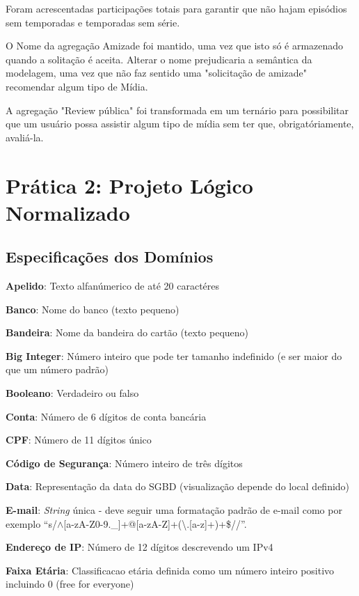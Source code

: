 \documentclass[12pt,a4paper]{article}
\begin{document}
    Foram acrescentadas participações totais para garantir que não hajam episódios sem temporadas e temporadas sem série.

    O Nome da agregação Amizade foi mantido, uma vez que isto só é armazenado quando a solitação é aceita. Alterar o nome prejudicaria a semântica da modelagem, uma vez que não faz sentido uma "solicitação de amizade" recomendar algum tipo de Mídia.

    A agregação "Review pública" foi transformada em um ternário para possibilitar que um usuário possa assistir algum tipo de mídia sem ter que, obrigatóriamente, avaliá-la.

\section{Prática 2: Projeto Lógico Normalizado}\label{sec:mrel}

\subsection{Especificações dos Domínios}

    {\bf Apelido}: Texto alfanúmerico de até 20 caractéres 
    
    {\bf Banco}: Nome do banco (texto pequeno) 
    
    {\bf Bandeira}: Nome da bandeira do cartão (texto pequeno) 
    
    {\bf Big Integer}: Número inteiro que pode ter tamanho indefinido (e ser maior do que um número padrão) 
    
    {\bf Booleano}: Verdadeiro ou falso 
    
    {\bf Conta}: Número de 6 dígitos de conta bancária 
    
    {\bf CPF}: Número de 11 dígitos único  
    
    {\bf Código de Segurança}: Número inteiro de três dígitos 
    
    {\bf Data}: Representação da data do SGBD (visualização depende do local definido) 
    
    {\bf E-mail}: {\it String} única - deve seguir uma formatação padrão de e-mail como por exemplo ``s/$\wedge$[a-zA-Z0-9.\_]+@[a-zA-Z]+(\textbackslash.[a-z]+)+\$//''. 
    
    {\bf Endereço de IP}: Número de 12 dígitos descrevendo um IPv4 
    
    {\bf Faixa Etária}: Classificacao etária definida como um número inteiro positivo incluindo 0 (free for everyone) 
    
\end{document}

